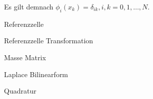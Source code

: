 Es gilt demnach $\phi_i (x_k) = \delta_{ik}, i,k =0,1,\dots,N$.

\begin{Bemerkung} Referenzzelle

\end{Bemerkung}

\begin{Satz} Referenzzelle Transformation

\end{Satz}

\begin{Definition} Masse Matrix \\

\end{Definition}

\begin{Definition} Laplace Bilinearform \\

\end{Definition}

\begin{Satz} Quadratur \\

\end{Satz}


